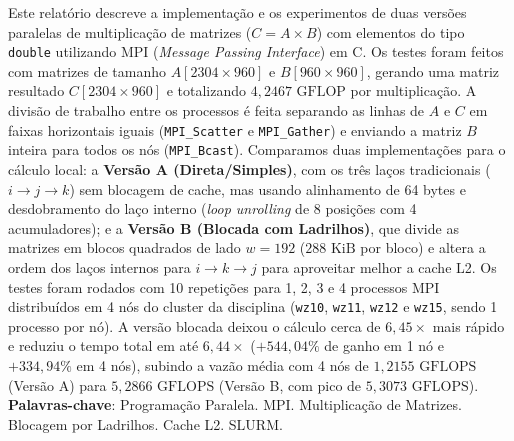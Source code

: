 \documentclass[12pt, a4paper, twoside, chapter=TITLE, subsection=TITLE, section=TITLE, subsubsection=TITLE, english, brazil]{abntex2}
\begin{document}
\pretextual 
\imprimircapa
\imprimirfolhaderosto*
\cleardoublepage

\begin{resumo}[Resumo] 
    Este relatório descreve a implementação e os experimentos de duas versões paralelas de multiplicação de matrizes ($C = A \times B$) com elementos do tipo \texttt{double} utilizando MPI (\textit{Message Passing Interface}) em C. Os testes foram feitos com matrizes de tamanho $A[2304 \times 960]$ e $B[960 \times 960]$, gerando uma matriz resultado $C[2304 \times 960]$ e totalizando $4,2467\text{ GFLOP}$ por multiplicação. A divisão de trabalho entre os processos é feita separando as linhas de $A$ e $C$ em faixas horizontais iguais (\nolinkurl{MPI_Scatter} e \nolinkurl{MPI_Gather}) e enviando a matriz $B$ inteira para todos os nós (\nolinkurl{MPI_Bcast}). Comparamos duas implementações para o cálculo local: a \textbf{Versão A (Direta/Simples)}, com os três laços tradicionais ($i \to j \to k$) sem blocagem de cache, mas usando alinhamento de 64 bytes e desdobramento do laço interno (\textit{loop unrolling} de 8 posições com 4 acumuladores); e a \textbf{Versão B (Blocada com Ladrilhos)}, que divide as matrizes em blocos quadrados de lado $w = 192$ ($288\text{ KiB}$ por bloco) e altera a ordem dos laços internos para $i \to k \to j$ para aproveitar melhor a cache L2. Os testes foram rodados com 10 repetições para 1, 2, 3 e 4 processos MPI distribuídos em 4 nós do cluster da disciplina (\texttt{wz10}, \texttt{wz11}, \texttt{wz12} e \texttt{wz15}, sendo 1 processo por nó). A versão blocada deixou o cálculo cerca de $6,45\times$ mais rápido e reduziu o tempo total em até $6,44\times$ ($+544,04\%$ de ganho em 1 nó e $+334,94\%$ em 4 nós), subindo a vazão média com 4 nós de $1,2155\text{ GFLOPS}$ (Versão A) para $5,2866\text{ GFLOPS}$ (Versão B, com pico de $5,3073\text{ GFLOPS}$). \\
    \vspace{\onelineskip}
    \noindent
    \textbf{Palavras-chave}: Programação Paralela. MPI. Multiplicação de Matrizes. Blocagem por Ladrilhos. Cache L2. SLURM.
\end{resumo}
\end{document}
